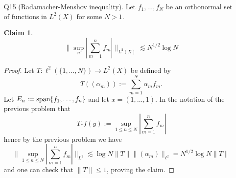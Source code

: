 \documentclass[11pt]{article}
\newtheorem*{claim}{Claim}
\theoremstyle{remark}
\newcommand{\1}{\textbf{1}}
\newcommand{\lle}{\lesssim}
\def\norm#1{\| #1  \|}
\begin{document}
\begin{enumerate}
\begin{proof}
First, let $E_{1,1}$ and be the largest index such that
\[
\norm{f \1_{E_{1,1}} }_{L^p}^p \leq \frac{1}{2}
\] 
This is possible since $\norm{f\1_{E_n}}$ increases from $0$ to $1$. Now let $E_{1,2}, E_{3,2}$ be the sets with smallest (or largest) index such that
\[
\norm{f \1_{E_{1,2}} }_{L^p}^p \leq \frac{1}{4}, \quad \norm{f \1_{E_{3,2}} }_{L^p}^p \leq \frac{3}{4}
\]
In such a way, for $m = 1, \ldots, \log N$ and $j_m = 1, \ldots, 2^{m-1}$ to be the numbers coprime to $2$. (Dropping subscripts) we define $(j,m)$ to be such that
\[
\norm{f \1_{E_{j,m}} }_{L^p}^p \leq \frac{j_m}{2^m}
\]
and we let $f_{j,m} = f\1_{X_{j,m}}$ with $X_{j,m} = E_{j,m} \backslash E_{j-1,m}$.
Then
\[
\norm{f \1_{X_{j,m}} }_{p}^p \leq \frac{1}{2^{m-1}}, \quad \textup{and} \quad f\1_{E_n} =\sum_{m=1}^{\log N} \sum_{j_m=1}^{2^{m-1}} f_{j,m}
\]
Thus
\[
T_* f \leq \sum_{m=1}^{\log N} \sup_{1 \leq j \leq 2^{m-1}} |T(f_{j,m})| \leq \sum_{m=1}^{\log N} \left(\sum_{j=1}^{2^{m-1}} |T(f_{j,m})|^p \right)^{1/p}.
\]
Now
\[
\int \sum_{j=1}^{2^{m-1}} |T(f\1_{j,m})|^p \leq \sum_{j=1}^{2^{m-1}}  \frac{\norm{T}}{2^{m-1}} = 1.
\]
Hence
\[
\norm{T_* f }^p_{L^p} \lle \sum_{m=1}^{\log N} \sum_{j=1}^{2^{m-1}} \norm{T(f_{j,m})}_{L^p}^p = \log N
\]
\end{proof}
\item[Q15] (Radamacher-Menshov inequality). Let $f_1, \ldots, f_N$ be an orthonormal set of functions in $L^2(X)$ for some $N > 1$.
\begin{claim}
\[
\norm{\sup_n |\sum_{m=1}^n f_m|}_{L^2(X)} \lle N^{1/2} \log N
\]
\end{claim}
\begin{proof}
Let $T: \ell^2(\{1, \ldots, N\}) \to L^2(X)$ be defined by
\[
T((\alpha_m)) := \sum_{m=1}^N \alpha_m f_m.
\]
Let $E_n:=\textup{span}\{f_1, \ldots, f_n\}$ and let $x = (1, \ldots, 1)$. In the notation of the previous problem that 
\[
T_*f(y) := \sup_{1 \leq n \leq N} |\sum_{m=1}^n f_m|
\]
hence by the previous problem we have
\[
\norm{\sup_{1 \leq n \leq N} |\sum_{m=1}^n f_m|}_{L^2} \lle \log N \norm{T} \norm{(\alpha_m)}_{\ell^2} = N^{1/2} \log N \norm{T}
\]
and one can check that $\norm{T} \leq 1$, proving the claim.
\end{proof}
\end{enumerate}
\end{document}

